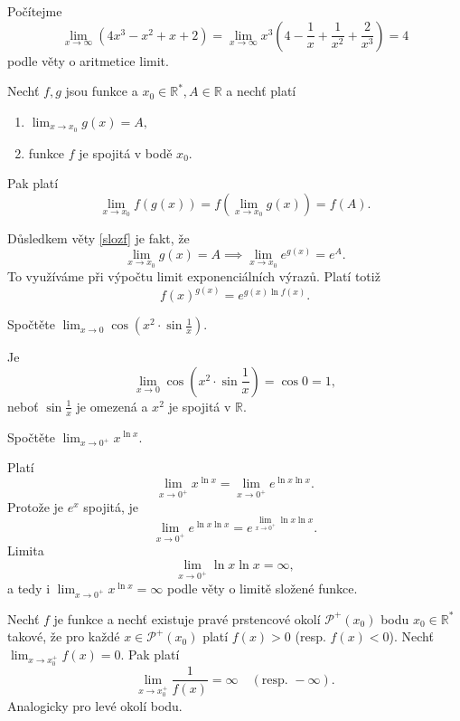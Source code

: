 \begin{reseni}
Počítejme
$$
    \lim_{x\to \infty}\left ( 4x^3-x^2+x+2 \right ) = \lim_{x \to \infty}  x^3 \left( 4 - \frac{1}{x} + \frac{1}{x^2} + \frac{2}{x^3} \right ) = 4
$$
podle věty o aritmetice limit.
\end{reseni}

\begin{veta}\label{slozf}
Nechť $f,g$ jsou funkce a $x_0\in \mathbb R^*, A \in \mathbb R$ a nechť platí
\begin{enumerate}[$i.$]
\item $\lim_{x\to x_0}g(x)=A,$
\item funkce $f$ je spojitá v bodě $x_0.$
\end{enumerate}
Pak platí
$$\lim_{x\to x_0}f \left ( g(x) \right ) =f \left ( \lim_{x\to x_0}g(x) \right ) =f(A).$$
\end{veta}


\begin{pozn}
    Důsledkem věty \ref{slozf} je fakt, že
    $$\lim_{x\to x_0}g(x)=A \implies \lim_{x\to x_0}e^{g(x)}=e^A.$$
    To využíváme při výpočtu limit exponenciálních výrazů. Platí totiž
    $$f(x)^{g(x)}=e^{g(x)\ln f(x)}.$$
\end{pozn}

\begin{priklad}
Spočtěte $\lim_{x\to 0} \cos \left ( x^2\cdot \sin \frac{1}{x} \right ) $.
\end{priklad}

\begin{reseni}
Je
$$\lim_{x\to 0} \cos \left ( x^2\cdot \sin \frac{1}{x} \right ) =\cos 0 =1,$$
neboť $\sin \frac{1}{x}$ je omezená a $x^2$ je spojitá v $\mathbb R$.
\end{reseni}

\begin{priklad}
Spočtěte $\lim_{x\to 0^+}x^{\ln x}.$
\end{priklad}

\begin{reseni}
Platí
$$\lim_{x\to 0^+}x^{\ln x}=\lim_{x\to 0^+}e^{\ln x\ln x}.$$
Protože je $e^x$ spojitá, je
$$\lim_{x\to 0^+}e^{\ln x\ln x}=e^{\lim_{x\to 0^+}\ln x\ln x}.$$
Limita
$$
    \lim_{x\to 0^+}\ln x\ln x = \infty,
$$
a tedy i $\lim_{x\to 0^+}x^{\ln x} = \infty$ podle věty o limitě složené funkce.
\end{reseni}

\begin{veta}
Nechť $f$ je funkce a nechť existuje pravé prstencové okolí $\mathscr P^+(x_0)$ bodu
$x_0\in \mathbb R^*$ takové, že pro každé $x\in \mathscr P^+(x_0)$ platí
$f(x)>0$ (resp. $f(x)<0$). Nechť $\lim_{x\to x_0^+}f(x)=0.$ Pak platí
$$\lim_{x\to x_0^+} \frac{1}{f(x)}=\infty \quad (\textrm{resp. } -\infty).$$
Analogicky pro levé okolí bodu.
\end{veta}

